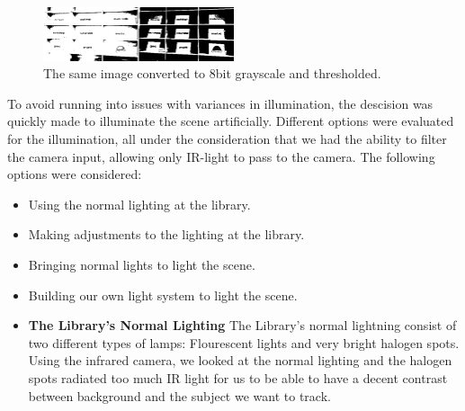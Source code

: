 \begin{figure}[htbp] 
\centering 
\includegraphics[width=0.5\textwidth]{Pictures/HjoerringLibrary/scene_lighting_thresholded.png} 
\caption{The same image converted to 8bit grayscale and thresholded.} 
\label{fig:scene_thresholded} 
\end{figure}

To avoid running into issues with variances in illumination, the descision was quickly made to illuminate the scene artificially. Different options were evaluated for the illumination, all under the consideration that we had the ability to filter the camera input, allowing only IR-light to pass to the camera. The following options were considered:

\begin{itemize}
\item Using the normal lighting at the library.
\item Making adjustments to the lighting at the library.
\item Bringing normal lights to light the scene.
\item Building our own light system to light the scene.
\end{itemize}

\begin{itemize}
\item \textbf{The Library's Normal Lighting}
The Library's normal lightning consist of two different types of lamps: Flourescent lights and very bright halogen spots. Using the infrared camera, we looked at the normal lighting and the halogen spots radiated too much IR light for us to be able to have a decent contrast between background and the subject we want to track.

\end{itemize}
